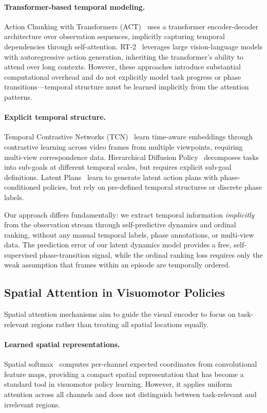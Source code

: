 \paragraph{Transformer-based temporal modeling.} Action Chunking with Transformers (ACT)~\cite{zhao2023act} uses a transformer encoder-decoder architecture over observation sequences, implicitly capturing temporal dependencies through self-attention. RT-2~\cite{brohan2023rt2} leverages large vision-language models with autoregressive action generation, inheriting the transformer's ability to attend over long contexts. However, these approaches introduce substantial computational overhead and do not explicitly model task progress or phase transitions---temporal structure must be learned implicitly from the attention patterns.

\paragraph{Explicit temporal structure.} Temporal Contrastive Networks (TCN)~\cite{sermanet2018time} learn time-aware embeddings through contrastive learning across video frames from multiple viewpoints, requiring multi-view correspondence data. Hierarchical Diffusion Policy~\cite{ma2024hierarchical} decomposes tasks into sub-goals at different temporal scales, but requires explicit sub-goal definitions. Latent Plans~\cite{lee2024behavior} learn to generate latent action plans with phase-conditioned policies, but rely on pre-defined temporal structures or discrete phase labels.

Our approach differs fundamentally: we extract temporal information \emph{implicitly} from the observation stream through self-predictive dynamics and ordinal ranking, without any manual temporal labels, phase annotations, or multi-view data. The prediction error of our latent dynamics model provides a free, self-supervised phase-transition signal, while the ordinal ranking loss requires only the weak assumption that frames within an episode are temporally ordered.

\subsection{Spatial Attention in Visuomotor Policies}

Spatial attention mechanisms aim to guide the visual encoder to focus on task-relevant regions rather than treating all spatial locations equally.

\paragraph{Learned spatial representations.} Spatial softmax~\cite{levine2016end} computes per-channel expected coordinates from convolutional feature maps, providing a compact spatial representation that has become a standard tool in visuomotor policy learning. However, it applies uniform attention across all channels and does not distinguish between task-relevant and irrelevant regions.

